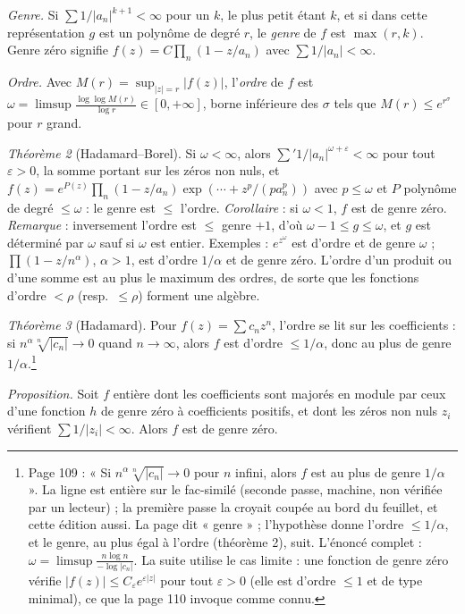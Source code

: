 \documentclass[11pt,a4paper]{article}
\begin{document}
\emph{Genre.} Si $\sum 1/|a_n|^{k+1} < \infty$ pour un $k$, le plus petit
étant $k$, et si dans cette représentation $g$ est un polynôme de degré $r$,
le \emph{genre} de $f$ est $\max(r, k)$. Genre zéro signifie $f(z) = C
\prod_n (1 - z/a_n)$ avec $\sum 1/|a_n| < \infty$.

\emph{Ordre.} Avec $M(r) = \sup_{|z| = r} |f(z)|$, l'\emph{ordre} de $f$ est
$\omega = \limsup \frac{\log\log M(r)}{\log r} \in [0, +\infty]$, borne
inférieure des $\sigma$ tels que $M(r) \leq e^{r^\sigma}$ pour $r$ grand.

\emph{Théorème 2} (Hadamard--Borel). Si $\omega < \infty$, alors
$\sum' 1/|a_n|^{\omega + \varepsilon} < \infty$ pour tout $\varepsilon > 0$,
la somme portant sur les zéros non nuls, et $f(z) = e^{P(z)}\prod_n (1 -
z/a_n)\exp(\cdots + z^p/(p a_n^p))$ avec $p \leq \omega$ et $P$ polynôme de
degré $\leq \omega$ : le genre est $\leq$ l'ordre. \emph{Corollaire} : si
$\omega < 1$, $f$ est de genre zéro. \emph{Remarque} : inversement l'ordre
est $\leq$ genre $+ 1$, d'où $\omega - 1 \leq g \leq \omega$, et $g$ est
déterminé par $\omega$ sauf si $\omega$ est entier. Exemples : $e^{z^\omega}$
est d'ordre et de genre $\omega$ ; $\prod (1 - z/n^\alpha)$, $\alpha > 1$,
est d'ordre $1/\alpha$ et de genre zéro. L'ordre d'un produit ou d'une somme
est au plus le maximum des ordres, de sorte que les fonctions d'ordre $<
\rho$ (resp.\ $\leq \rho$) forment une algèbre.

\emph{Théorème 3} (Hadamard). Pour $f(z) = \sum c_n z^n$, l'ordre se lit sur
les coefficients : si $n^\alpha\sqrt[n]{|c_n|} \to 0$ quand $n \to \infty$,
alors $f$ est d'ordre $\leq 1/\alpha$, donc au plus de genre
$1/\alpha$.\footnote{Page 109 : « Si $n^\alpha \sqrt[n]{|c_n|} \to 0$ pour
$n$ infini, alors $f$ est au plus de genre $1/\alpha$ ». La ligne est entière
sur le fac-similé (seconde passe, machine, non vérifiée par un lecteur) ; la
première passe la croyait coupée au bord du feuillet, et cette édition aussi.
La page dit « genre » ; l'hypothèse donne l'ordre $\leq 1/\alpha$,
et le genre, au plus égal à l'ordre (théorème 2), suit. L'énoncé complet :
$\omega = \limsup \frac{n\log n}{-\log|c_n|}$. La suite utilise le cas
limite : une fonction de genre zéro vérifie $|f(z)| \leq C_\varepsilon
e^{\varepsilon|z|}$ pour tout $\varepsilon > 0$ (elle est d'ordre $\leq 1$ et
de type minimal), ce que la page 110 invoque comme connu.}

\emph{Proposition.} Soit $f$ entière dont les coefficients sont majorés en
module par ceux d'une fonction $h$ de genre zéro à coefficients positifs,
et dont les zéros non nuls $z_i$ vérifient $\sum 1/|z_i| < \infty$. Alors $f$
est de genre zéro.
\end{document}
